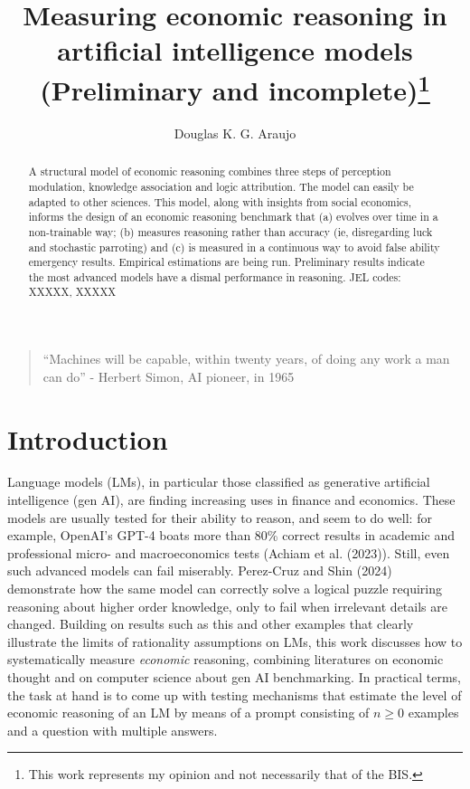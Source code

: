 \documentclass[
]{article}
\title{Measuring economic reasoning in artificial intelligence models
(Preliminary and incomplete)\thanks{This work represents my opinion and
not necessarily that of the BIS.}}
\author{Douglas K. G. Araujo}
\affil{%
                  Bank for International
Settlements, douglas.araujo@bis.org
              }
\date{}
\begin{document}
\maketitle
\begin{abstract}
A structural model of economic reasoning combines three steps of
perception modulation, knowledge association and logic attribution. The
model can easily be adapted to other sciences. This model, along with
insights from social economics, informs the design of an economic
reasoning benchmark that (a) evolves over time in a non-trainable way;
(b) measures reasoning rather than accuracy (ie, disregarding luck and
stochastic parroting) and (c) is measured in a continuous way to avoid
false ability emergency results. Empirical estimations are being run.
Preliminary results indicate the most advanced models have a dismal
performance in reasoning. JEL codes: XXXXX, XXXXX
\end{abstract}

\begin{quote}
``Machines will be capable, within twenty years, of doing any work a man
can do'' - Herbert Simon, AI pioneer, in 1965
\end{quote}

\section{Introduction}\label{introduction}

Language models (LMs), in particular those classified as generative
artificial intelligence (gen AI), are finding increasing uses in finance
and economics. These models are usually tested for their ability to
reason, and seem to do well: for example, OpenAI's GPT-4 boats more than
80\% correct results in academic and professional micro- and
macroeconomics tests (Achiam et al. (2023)). Still, even such advanced
models can fail miserably. Perez-Cruz and Shin (2024) demonstrate how
the same model can correctly solve a logical puzzle requiring reasoning
about higher order knowledge, only to fail when irrelevant details are
changed. Building on results such as this and other examples that
clearly illustrate the limits of rationality assumptions on LMs, this
work discusses how to systematically measure \emph{economic} reasoning,
combining literatures on economic thought and on computer science about
gen AI benchmarking. In practical terms, the task at hand is to come up
with testing mechanisms that estimate the level of economic reasoning of
an LM by means of a prompt consisting of \(n \geq 0\) examples and a
question with multiple answers.
\end{document}
